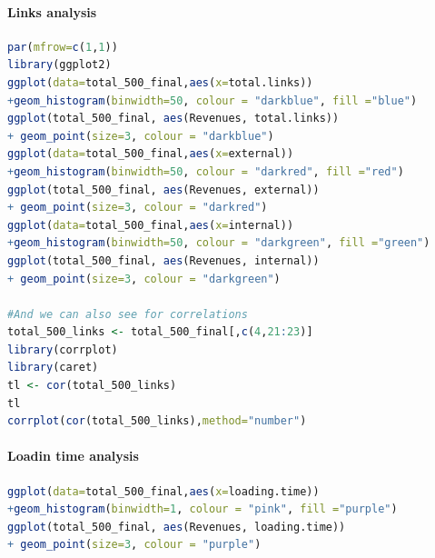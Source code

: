 \documentclass{article}
\begin{document}
\paragraph{Links analysis}\label{r: van: l}
\begin{lstlisting}[language=R] 
par(mfrow=c(1,1))
library(ggplot2)
ggplot(data=total_500_final,aes(x=total.links))
+geom_histogram(binwidth=50, colour = "darkblue", fill ="blue")
ggplot(total_500_final, aes(Revenues, total.links)) 
+ geom_point(size=3, colour = "darkblue")
ggplot(data=total_500_final,aes(x=external))
+geom_histogram(binwidth=50, colour = "darkred", fill ="red")
ggplot(total_500_final, aes(Revenues, external)) 
+ geom_point(size=3, colour = "darkred")
ggplot(data=total_500_final,aes(x=internal))
+geom_histogram(binwidth=50, colour = "darkgreen", fill ="green")
ggplot(total_500_final, aes(Revenues, internal)) 
+ geom_point(size=3, colour = "darkgreen")

#And we can also see for correlations
total_500_links <- total_500_final[,c(4,21:23)]
library(corrplot)
library(caret)
tl <- cor(total_500_links)
tl
corrplot(cor(total_500_links),method="number")

 \end{lstlisting}
 
 
\paragraph{Loadin time analysis}\label{r: van: load}
\begin{lstlisting}[language=R] 
ggplot(data=total_500_final,aes(x=loading.time))
+geom_histogram(binwidth=1, colour = "pink", fill ="purple")
ggplot(total_500_final, aes(Revenues, loading.time)) 
+ geom_point(size=3, colour = "purple")
 \end{lstlisting}
\end{document}
